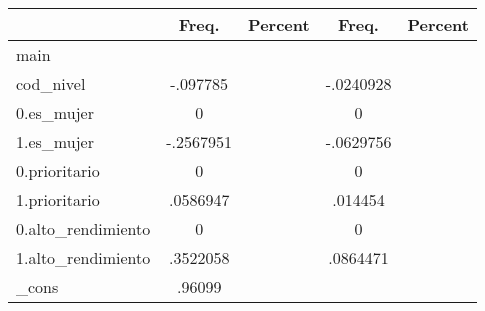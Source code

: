 {
\def\sym#1{\ifmmode^{#1}\else\(^{#1}\)\fi}
\begin{tabular}{l*{2}{cc}}
\hline\hline
            &       Freq.&     Percent&       Freq.&     Percent\\
\hline
main        &            &            &            &            \\
cod\_nivel   &    -.097785&            &   -.0240928&            \\
0.es\_mujer  &           0&            &           0&            \\
1.es\_mujer  &   -.2567951&            &   -.0629756&            \\
0.prioritario&           0&            &           0&            \\
1.prioritario&    .0586947&            &     .014454&            \\
0.alto\_rendimiento&           0&            &           0&            \\
1.alto\_rendimiento&    .3522058&            &    .0864471&            \\
\_cons      &      .96099&            &            &            \\
\hline\hline
\end{tabular}
}

